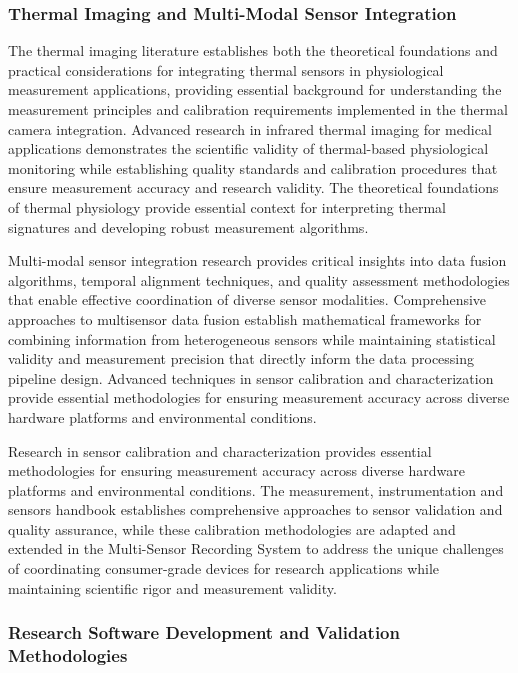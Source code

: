 \documentclass[11pt,a4paper]{report}
\begin{document}
\subsubsection{Thermal Imaging and Multi-Modal Sensor Integration}

The thermal imaging literature establishes both the theoretical foundations and practical considerations for integrating
thermal sensors in physiological measurement applications, providing essential background for understanding the
measurement principles and calibration requirements implemented in the thermal camera integration. Advanced research in
infrared thermal imaging for medical applications demonstrates the scientific validity of thermal-based physiological
monitoring while establishing quality standards and calibration procedures that ensure measurement accuracy and research
validity. The theoretical foundations of thermal physiology provide essential context for interpreting thermal
signatures and developing robust measurement algorithms.

Multi-modal sensor integration research provides critical insights into data fusion algorithms, temporal alignment
techniques, and quality assessment methodologies that enable effective coordination of diverse sensor modalities.
Comprehensive approaches to multisensor data fusion establish mathematical frameworks for combining information from
heterogeneous sensors while maintaining statistical validity and measurement precision that directly inform the data
processing pipeline design. Advanced techniques in sensor calibration and characterization provide essential
methodologies for ensuring measurement accuracy across diverse hardware platforms and environmental conditions.

Research in sensor calibration and characterization provides essential methodologies for ensuring measurement accuracy
across diverse hardware platforms and environmental conditions. The measurement, instrumentation and sensors handbook
establishes comprehensive approaches to sensor validation and quality assurance, while these calibration methodologies
are adapted and extended in the Multi-Sensor Recording System to address the unique challenges of coordinating
consumer-grade devices for research applications while maintaining scientific rigor and measurement validity.

\subsubsection{Research Software Development and Validation Methodologies}
\end{document}
